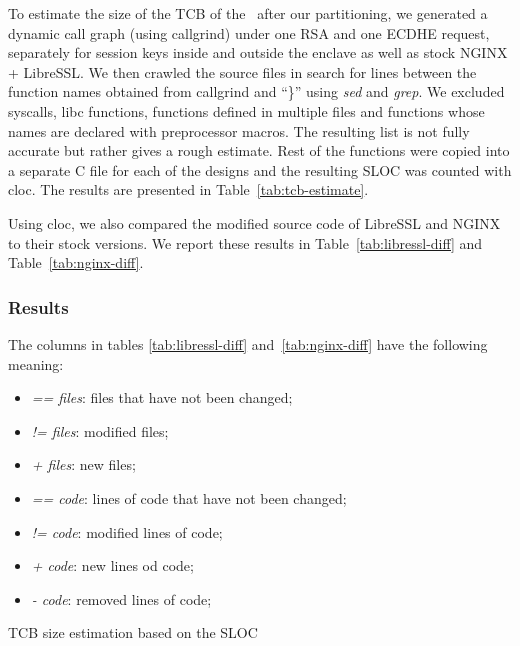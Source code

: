 \documentclass[../../../main.tex]{subfiles}
\begin{document}
\label{sec:tcb-analysis}
To estimate the size of the TCB of the \enclaveprogram~after our partitioning,
we generated a dynamic call graph (using callgrind) under one RSA and one ECDHE
request, separately for session keys inside and outside the enclave as well as
stock NGINX + LibreSSL. We then crawled the source files in search for lines
between the function names obtained from callgrind and ``\}'' using
\textit{sed} and \textit{grep}. We excluded syscalls, libc functions,
functions defined in multiple files and functions whose names are
declared with preprocessor macros. The resulting list is not fully accurate
but rather gives a rough estimate. Rest of the functions were copied into a
separate C file for each of the designs and the resulting SLOC was counted
with cloc. The results are presented in Table~\ref{tab:tcb-estimate}.

Using cloc, we also compared the modified source code of LibreSSL and NGINX to
their stock versions. We report these results in Table~\ref{tab:libressl-diff}
and Table~\ref{tab:nginx-diff}.

\subsubsection*{Results}
The columns in tables \ref{tab:libressl-diff} and~\ref{tab:nginx-diff} have
the following meaning:
\begin{itemize}
  \item \textit{\footnotesize == files}: files that have not been changed;
  \item \textit{\footnotesize != files}: modified files;
  \item \textit{\footnotesize + files}: new files;
  \item \textit{\footnotesize == code}: lines of code that have not been
    changed;
  \item \textit{\footnotesize != code}:  modified lines of code;
  \item \textit{\footnotesize + code}: new lines od code;
  \item \textit{\footnotesize - code}: removed lines of code;
\end{itemize}

\begin{table}[H]
  \center
  \footnotesize
  \caption{TCB size estimation based on the SLOC}
  \label{tab:tcb-estimate}
\end{table}
\end{document}
